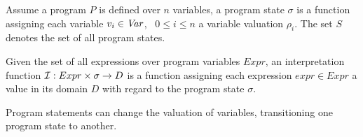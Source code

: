 
\begin{mydef}
	Assume a program $P$ is defined over $n$ variables, a program state $\sigma$ is a function assigning each variable $v_i \in \mathit{Var}$, \ $0 \leq i \leq n$ a variable valuation $\rho_i$. The set $S$ denotes the set of all program states.
\end{mydef}


\begin{mydef}
	Given the set of all expressions over program variables $\mathit{Expr}$, an interpretation function $\mathcal{I}: Expr \times \sigma \rightarrow D$ is a function assigning each expression $expr \in \mathit{Expr}$ a value in its domain $D$ with regard to the program state $\sigma$.
\end{mydef}



Program statements can change the valuation of variables, transitioning one program state to another.

